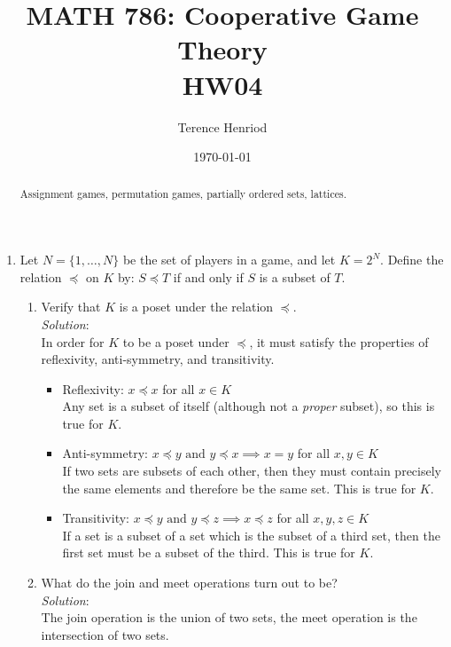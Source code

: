 \documentclass{article}
\title{MATH 786: Cooperative Game Theory \\ HW04}
\author{Terence Henriod}
\date{\today}
\begin{document}
\maketitle

\begin{abstract}
Assignment games, permutation games, partially ordered sets, lattices.
\end{abstract}


\newpage
\begin{enumerate}
\item Let $N = \{1, \dots, N\}$ be the set of players in a game, and let $K = 2^{N}$. Define the relation $\preceq$ on $K$ by: $S \preceq T$ if and only if $S$ is a subset of $T$.
    \begin{enumerate}
    \item Verify that $K$ is a poset under the relation $\preceq$. \\

    \textit{Solution}: \\
    In order for $K$ to be a poset under $\preceq$, it must satisfy the properties of reflexivity, anti-symmetry, and transitivity.

        \begin{itemize}
        \item Reflexivity: $x \preceq x$ for all $x \in K$ \\
        Any set is a subset of itself (although not a \emph{proper} subset), so this is true for $K$.

        \item Anti-symmetry: $x \preceq y \text{ and } y \preceq x \implies x = y$ for all $x, y \in K$ \\
        If two sets are subsets of each other, then they must contain precisely the same elements and therefore be the same set. This is true for $K$.

        \item Transitivity: $x \preceq y \text{ and } y \preceq z \implies x \preceq z$ for all $x, y, z \in K$ \\
        If a set is a subset of a set which is the subset of a third set, then the first set must be a subset of the third. This is true for $K$.
        \end{itemize}

    \item What do the join and meet operations turn out to be? \\

    \textit{Solution}: \\
    The join operation is the union of two sets, the meet operation is the intersection of two sets. \\


\end{enumerate}
\end{enumerate}
\end{document}

